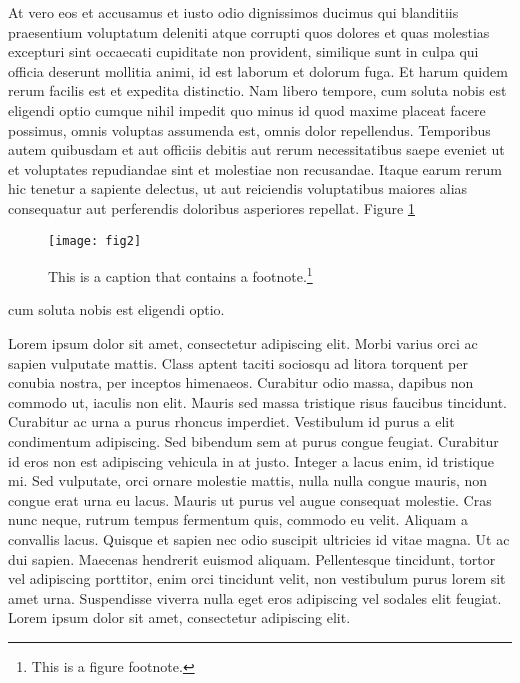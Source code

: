 At vero eos et accusamus et iusto odio dignissimos ducimus qui blanditiis praesentium voluptatum deleniti atque corrupti quos dolores et quas molestias excepturi sint occaecati cupiditate non provident, similique sunt in culpa qui officia deserunt mollitia animi, id est laborum et dolorum fuga. Et harum quidem rerum facilis est et expedita distinctio. Nam libero tempore, cum soluta nobis est eligendi optio cumque nihil impedit quo minus id quod maxime placeat facere possimus, omnis voluptas assumenda est, omnis dolor repellendus. Temporibus autem quibusdam et aut officiis debitis aut rerum necessitatibus saepe eveniet ut et voluptates repudiandae sint et molestiae non recusandae. Itaque earum rerum hic tenetur a sapiente delectus, ut aut reiciendis voluptatibus maiores alias consequatur aut perferendis doloribus asperiores repellat.  
Figure \ref{fig2}
\begin{figure}[h] %
\begin{minipage}[c]{\textwidth} %
    \begin{center}\texttt{[image: fig2]}\end{center}          %
	\caption[This is the caption for any LoF]{This is a caption that contains a footnote.\protect\footnote{This is a figure footnote.}} %
	\label{fig2}
	\end{minipage}
\end{figure}
 cum soluta nobis est eligendi optio.
	

Lorem ipsum dolor sit amet, consectetur adipiscing elit. Morbi varius orci ac sapien vulputate mattis. Class aptent taciti sociosqu ad litora torquent per conubia nostra, per inceptos himenaeos. Curabitur odio massa, dapibus non commodo ut, iaculis non elit. Mauris sed massa tristique risus faucibus tincidunt. Curabitur ac urna a purus rhoncus imperdiet. Vestibulum id purus a elit condimentum adipiscing. Sed bibendum sem at purus congue feugiat. Curabitur id eros non est adipiscing vehicula in at justo. Integer a lacus enim, id tristique mi. Sed vulputate, orci ornare molestie mattis, nulla nulla congue mauris, non congue erat urna eu lacus. Mauris ut purus vel augue consequat molestie. Cras nunc neque, rutrum tempus fermentum quis, commodo eu velit. Aliquam a convallis lacus. Quisque et sapien nec odio suscipit ultricies id vitae magna. Ut ac dui sapien. Maecenas hendrerit euismod aliquam. Pellentesque tincidunt, tortor vel adipiscing porttitor, enim orci tincidunt velit, non vestibulum purus lorem sit amet urna. Suspendisse viverra nulla eget eros adipiscing vel sodales elit feugiat. Lorem ipsum dolor sit amet, consectetur adipiscing elit.

